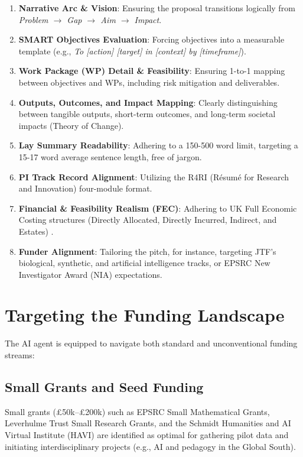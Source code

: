 \documentclass[11pt, a4paper]{article}
\begin{document}
\begin{enumerate}
    \item \textbf{Narrative Arc \& Vision}: Ensuring the proposal transitions logically from \textit{Problem $\rightarrow$ Gap $\rightarrow$ Aim $\rightarrow$ Impact}.
    \item \textbf{SMART Objectives Evaluation}: Forcing objectives into a measurable template (e.g., \textit{To [action] [target] in [context] by [timeframe]}).
    \item \textbf{Work Package (WP) Detail \& Feasibility}: Ensuring 1-to-1 mapping between objectives and WPs, including risk mitigation and deliverables.
    \item \textbf{Outputs, Outcomes, and Impact Mapping}: Clearly distinguishing between tangible outputs, short-term outcomes, and long-term societal impacts (Theory of Change).
    \item \textbf{Lay Summary Readability}: Adhering to a 150-500 word limit, targeting a 15-17 word average sentence length, free of jargon.
    \item \textbf{PI Track Record Alignment}: Utilizing the R4RI (Résumé for Research and Innovation) four-module format.
    \item \textbf{Financial \& Feasibility Realism (FEC)}: Adhering to UK Full Economic Costing structures (Directly Allocated, Directly Incurred, Indirect, and Estates) \cite{epsrc2023fec}.
    \item \textbf{Funder Alignment}: Tailoring the pitch, for instance, targeting JTF's biological, synthetic, and artificial intelligence tracks, or EPSRC New Investigator Award (NIA) expectations.
\end{enumerate}

\section{Targeting the Funding Landscape}
The AI agent is equipped to navigate both standard and unconventional funding streams:
\subsection{Small Grants and Seed Funding}
Small grants (£50k--£200k) such as EPSRC Small Mathematical Grants, Leverhulme Trust Small Research Grants, and the Schmidt Humanities and AI Virtual Institute (HAVI) are identified as optimal for gathering pilot data and initiating interdisciplinary projects (e.g., AI and pedagogy in the Global South).
\end{document}
